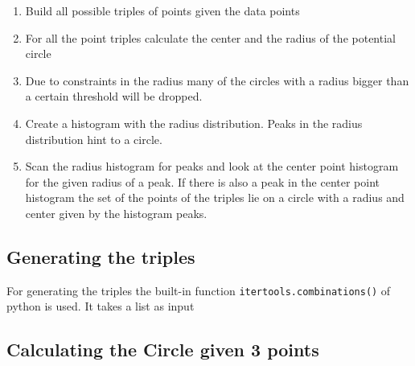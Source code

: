 \documentclass[10pt,twoside]{scrreprt}
\begin{document}
\begin{enumerate}
\item Build all possible triples of points given the data points
\item For all the point triples calculate the center and the radius of the potential circle
\item Due to constraints in the radius many of the circles with a radius bigger than a certain threshold will be dropped.
\item Create a histogram with the radius distribution. Peaks in the radius distribution hint to a circle.
\item Scan the radius histogram for peaks and look at the center point histogram for the given radius of a peak. If there is also a peak in the center point histogram
      the set of the points of the triples lie on a circle with a radius and center given by the histogram peaks.
\end{enumerate}

\subsection{Generating the triples} %
\label{sub:generating_the_triples}
For generating the triples the built-in function \texttt{itertools.combinations()} of python is used. It takes a list as input


\subsection{Calculating the Circle given 3 points}
\end{document}

